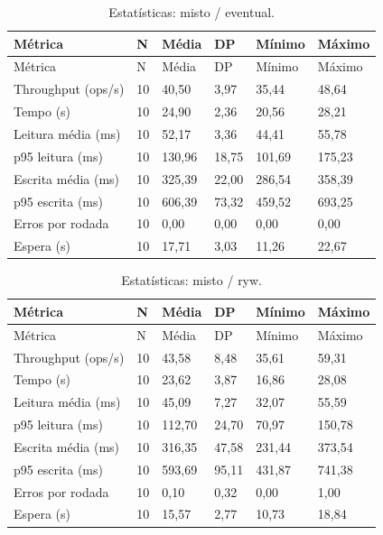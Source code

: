 \begingroup\small\setlength{\tabcolsep}{4pt}
\begin{longtable}{llllll}
\caption{Estatísticas: misto / eventual.}\\
\toprule
Métrica & N & Média & DP & Mínimo & Máximo\\\midrule\endfirsthead
\toprule
Métrica & N & Média & DP & Mínimo & Máximo\\\midrule\endhead
\bottomrule\endfoot
Throughput (ops/s) & 10 & 40,50 & 3,97 & 35,44 & 48,64\\
Tempo (s) & 10 & 24,90 & 2,36 & 20,56 & 28,21\\
Leitura média (ms) & 10 & 52,17 & 3,36 & 44,41 & 55,78\\
p95 leitura (ms) & 10 & 130,96 & 18,75 & 101,69 & 175,23\\
Escrita média (ms) & 10 & 325,39 & 22,00 & 286,54 & 358,39\\
p95 escrita (ms) & 10 & 606,39 & 73,32 & 459,52 & 693,25\\
Erros por rodada & 10 & 0,00 & 0,00 & 0,00 & 0,00\\
Espera (s) & 10 & 17,71 & 3,03 & 11,26 & 22,67\\
\end{longtable}
\endgroup

\begingroup\small\setlength{\tabcolsep}{4pt}
\begin{longtable}{llllll}
\caption{Estatísticas: misto / ryw.}\\
\toprule
Métrica & N & Média & DP & Mínimo & Máximo\\\midrule\endfirsthead
\toprule
Métrica & N & Média & DP & Mínimo & Máximo\\\midrule\endhead
\bottomrule\endfoot
Throughput (ops/s) & 10 & 43,58 & 8,48 & 35,61 & 59,31\\
Tempo (s) & 10 & 23,62 & 3,87 & 16,86 & 28,08\\
Leitura média (ms) & 10 & 45,09 & 7,27 & 32,07 & 55,59\\
p95 leitura (ms) & 10 & 112,70 & 24,70 & 70,97 & 150,78\\
Escrita média (ms) & 10 & 316,35 & 47,58 & 231,44 & 373,54\\
p95 escrita (ms) & 10 & 593,69 & 95,11 & 431,87 & 741,38\\
Erros por rodada & 10 & 0,10 & 0,32 & 0,00 & 1,00\\
Espera (s) & 10 & 15,57 & 2,77 & 10,73 & 18,84\\
\end{longtable}
\endgroup

